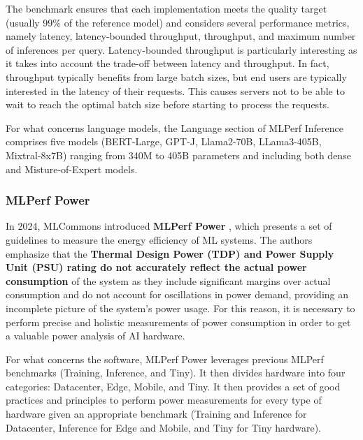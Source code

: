 \documentclass[conference]{IEEEtran}
\begin{document}
The benchmark ensures that each implementation meets the quality target (usually 99\% of the reference model) and considers several
performance metrics, namely latency, latency-bounded throughput, throughput, and maximum number of inferences per query. Latency-bounded throughput is particularly interesting as it takes into account the trade-off between latency and throughput. In fact, throughput typically benefits from large batch sizes, but end users are typically interested in the latency of their requests. This causes servers not to be able to wait to reach the optimal batch size before starting to process the requests.

For what concerns language models, the Language section of MLPerf Inference comprises five models (BERT-Large, GPT-J, Llama2-70B, LLama3-405B, Mixtral-8x7B) ranging from 340M to 405B parameters and including both dense and Misture-of-Expert models.

\subsubsection{MLPerf Power}
In 2024, MLCommons introduced \textbf{MLPerf Power} \cite{Tschand2024}, which presents a set of guidelines to measure the energy efficiency of ML systems. The authors emphasize that the \textbf{Thermal Design Power (TDP) and Power Supply Unit (PSU) rating do not accurately reflect the actual power consumption} of the system as they include significant margins over actual consumption and do not account for oscillations in power demand, providing an incomplete picture of the system's power usage. For this reason, it is necessary to perform precise and holistic measurements of power consumption in order to get a valuable power analysis of AI hardware.

For what concerns the software, MLPerf Power leverages previous MLPerf benchmarks (Training, Inference, and Tiny). It then divides hardware into four categories: Datacenter, Edge, Mobile, and Tiny. It then provides a set of good practices and principles to perform power measurements for every type of hardware given an appropriate benchmark (Training and Inference for Datacenter, Inference for Edge and Mobile, and Tiny for Tiny hardware).
\end{document}

